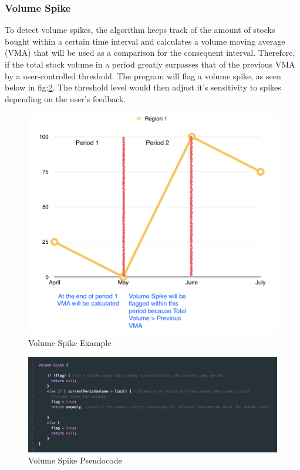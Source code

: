 \documentclass[12pt]{article}
\begin{document}
    \subsubsection{Volume Spike}
    To detect volume spikes, the algorithm keeps track of the amount of stocks bought within a certain time interval and calculates a volume moving average (VMA) that will be used as a comparison for the consequent interval. Therefore, if the total stock
    volume in a period greatly surpasses that of the previous VMA by a user-controlled threshold. The program will flag a volume spike, as seen below in fig:\ref{4}. The threshold level would then adjust it's sensitivity to spikes depending on the user's feedback.
    \begin{figure}[H]
    \centering
    \includegraphics[width=130mm]{VSGraph.png}
    \caption{Volume Spike Example}
    \label{3}
    \end{figure}
    \begin{figure}[H]
    \centering
    \includegraphics[width=150mm]{VSpseudo.png}
    \caption{Volume Spike Pseudocode}
    \label{4}
    \end{figure}
    \newpage
\end{document}
